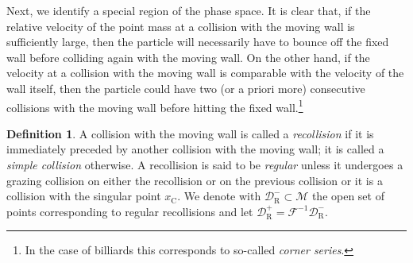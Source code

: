 \documentclass[10pt]{amsart}
\theoremstyle{definition}\newtheorem{defi}[theo]{Definition}\newtheorem{rema}[theo]{Remark}\newtheorem{exam}[theo]{Example}\newtheorem{exem}[theo]{Example}\newtheorem{nota}[theo]{Notation}
\newcommand{\inv}{^{-1}}
\newcommand{\crit}{\mathrm{C}}
\newcommand{\xc}{x_\crit}
\newcommand{\cm}{\mathcal{F}}
\newcommand{\cell}{\mathcal{D}}
\newcommand{\csp}{\mathcal{M}}
\newcommand{\recoPrivate}{\mathrm{R}}
\newcommand{\reco}{{\cell^-_{\recoPrivate}}}
\newcommand{\backReco}{{\cell^+_{\recoPrivate}}}
\begin{document}
Next, we identify a special region of the phase space. It is clear that, if the relative velocity of the point mass at a collision with the moving wall is sufficiently large, then the particle will necessarily have to bounce off the fixed wall before colliding again with the moving wall. On the other hand, if the velocity at a collision with the moving wall is comparable with the velocity of the wall itself, then the particle could have two (or a priori more) consecutive collisions with the moving wall before hitting the fixed wall.\footnote{ In the case of billiards this corresponds to so-called
\emph{corner series}.}
\begin{defi}
A collision with the moving wall is called a \emph{recollision} if it is immediately preceded by another collision with the moving wall; it is called a \emph{simple collision} otherwise. A recollision is said to be \emph{regular} unless it undergoes a grazing collision on either the recollision or on the previous collision or it is a collision with the singular point $\xc$. We denote with $\reco\subset\csp$ the open set of points corresponding to regular recollisions and let $\backReco=\cm\inv\reco$.
\end{defi}
\end{document}
